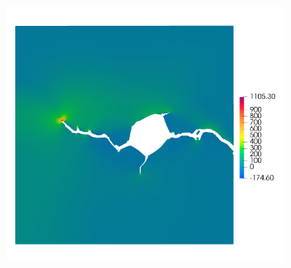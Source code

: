 \begin{frame}
\begin{columns}[T]
\begin{column}{0.4\textwidth}
\begin{figure}
\begin{subfigure}[t]{0.47\linewidth}
        \end{subfigure}
        \begin{subfigure}[t]{0.47\linewidth}
          \centering
          \includegraphics[width=0.9\linewidth]{Chapter345/figures/partial_hbs_1_stress}
        \end{subfigure}
        

\end{figure}
\end{column}
\end{columns}
\end{frame}
